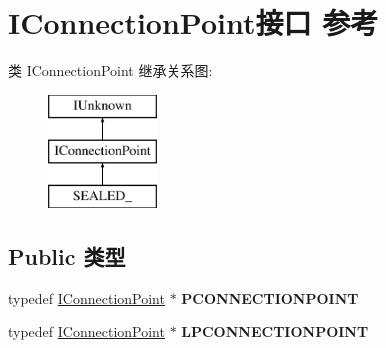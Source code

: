 \hypertarget{interface_i_connection_point}{}\section{I\+Connection\+Point接口 参考}
\label{interface_i_connection_point}
类 I\+Connection\+Point 继承关系图\+:\begin{figure}[H]
\begin{center}
\leavevmode
\includegraphics[height=3.000000cm]{interface_i_connection_point}
\end{center}
\end{figure}
\subsection*{Public 类型}
\begin{DoxyCompactItemize}
\item 
\mbox{\label{interface_i_connection_point_a1bd5e4b7d7a2a9567f7e0f678aff2061}} 
typedef \hyperlink{interface_i_connection_point}{I\+Connection\+Point} $\ast$ {\bfseries P\+C\+O\+N\+N\+E\+C\+T\+I\+O\+N\+P\+O\+I\+NT}
\item 
\mbox{\label{interface_i_connection_point_a7200481c36b5614612f45e40248c9567}} 
typedef \hyperlink{interface_i_connection_point}{I\+Connection\+Point} $\ast$ {\bfseries L\+P\+C\+O\+N\+N\+E\+C\+T\+I\+O\+N\+P\+O\+I\+NT}
\end{DoxyCompactItemize}
